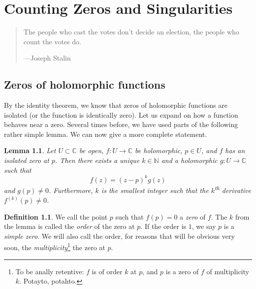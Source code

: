 \documentclass[12pt,openany]{book}
\newcommand{\C}{{\mathbb{C}}}
\newcommand{\N}{{\mathbb{N}}}
\newcommand{\myindex}[1]{#1\index{#1}}
\theoremstyle{plain}
\newtheorem{lemma}[thm]{Lemma}
\theoremstyle{remark}
\theoremstyle{definition}
\newtheorem{defn}[thm]{Definition}
\newenvironment{myquote}{%
    \begin{quote}%
    \begingroup\itshape
}{%
    \endgroup%
    \end{quote}
}
\theoremstyle{exercise}
\theoremstyle{example}
\begin{document}

\chapter{Counting Zeros and Singularities} \label{ch:counting}

\begin{myquote}
The people who cast the votes don't decide an election, the people who count
the votes do.

---Joseph Stalin
\end{myquote}


\section{Zeros of holomorphic functions}

By the identity theorem, we know that zeros of holomorphic functions are
isolated (or the function is identically zero).  Let us expand on how a
function behaves near a zero.
Several times before, we have used parts of the following rather simple
lemma.  We can now give a more complete statement.  

\begin{lemma}
Let $U \subset \C$ be open, $f \colon U \to \C$ be holomorphic, $p \in U$,
and $f$ has an isolated zero at $p$.
Then there exists a unique $k \in \N$ and a holomorphic $g \colon U
\to \C$ such that
\begin{equation*}
f(z) = {(z-p)}^k g(z)
\end{equation*}
and $g(p) \not= 0$.
Furthermore, $k$ is the smallest integer such that the $k$\textsuperscript{th}
derivative $f^{(k)}(p) \not= 0$.
\end{lemma}

\begin{defn}
We call the point $p$ such that $f(p) = 0$ a \emph{\myindex{zero}} of
$f$.
The $k$ from the lemma is called the \emph{order}
of the zero at $p$.
If the order is $1$, we say $p$ is a \emph{\myindex{simple zero}}.
We will also call the order, for reasons that will be obvious very soon,
the \emph{multiplicity}\footnote{%
To be anally retentive: $f$ is of order $k$ at $p$,
and $p$ is a zero of $f$ of multiplicity $k$.  Potayto, potahto.}
the zero at $p$.
\end{defn}
\end{document}
